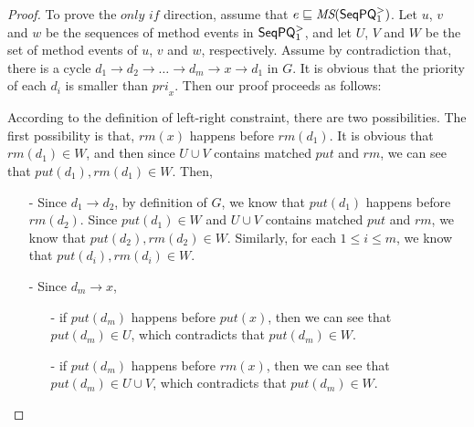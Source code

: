 \begin {proof}

To prove the $\textit{only if}$ direction, assume that $e \sqsubseteq \textit{MS}(\mathsf{SeqPQ}_1^{>})$. Let $u$, $v$ and $w$ be the sequences of method events in $\mathsf{SeqPQ}_1^{>}$, and let $U$, $V$ and $W$ be the set of method events of $u$, $v$ and $w$, respectively. Assume by contradiction that, there is a cycle $d_1 \rightarrow d_2 \rightarrow \ldots \rightarrow d_m \rightarrow x \rightarrow d_1$ in $G$. It is obvious that the priority of each $d_i$ is smaller than $\textit{pri}_x$. Then our proof proceeds as follows:

According to the definition of left-right constraint, there are two possibilities. The first possibility is that, $\textit{rm}(x)$ happens before $\textit{rm}(d_1)$. It is obvious that $\textit{rm}(d_1) \in W$, and then since $U \cup V$ contains matched $\textit{put}$ and $\textit{rm}$, we can see that $\textit{put}(d_1),\textit{rm}(d_1) \in W$. Then,

\begin{itemize}
\setlength{\itemsep}{0.5pt}
\item[-] Since $d_1 \rightarrow d_2$, by definition of $G$, we know that $\textit{put}(d_1)$ happens before $\textit{rm}(d_2)$. Since $\textit{put}(d_1) \in W$ and $U \cup V$ contains matched $\textit{put}$ and $\textit{rm}$, we know that $\textit{put}(d_2),\textit{rm}(d_2) \in W$. Similarly, for each $1 \leq i \leq m$, we know that $\textit{put}(d_i),\textit{rm}(d_i) \in W$.

\item[-] Since $d_m \rightarrow x$,
    \begin{itemize}
    \setlength{\itemsep}{0.5pt}
    \item[-] if $\textit{put}(d_m)$ happens before $\textit{put}(x)$, then we can see that $\textit{put}(d_m) \in U$, which contradicts that $\textit{put}(d_m) \in W$.

    \item[-] if $\textit{put}(d_m)$ happens before $\textit{rm}(x)$, then we can see that $\textit{put}(d_m) \in U \cup V$, which contradicts that $\textit{put}(d_m) \in W$.
    \end{itemize}
\end{itemize}


\end{proof}
